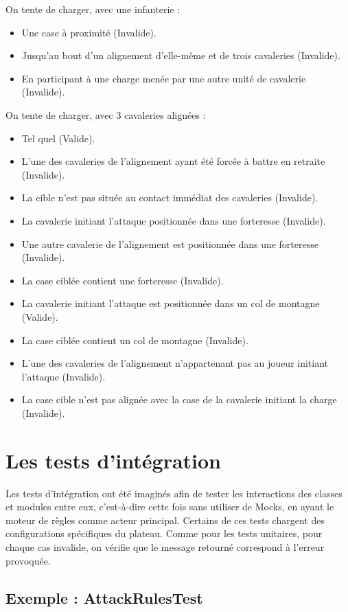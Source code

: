 \documentclass[a4paper]{report}
\begin{document}
On tente de charger, avec une infanterie :
\begin{itemize}
\item Une case à proximité (Invalide).
\item Jusqu'au bout d'un alignement d'elle-même et de trois cavaleries (Invalide).
\item En participant à une charge menée par une autre unité de cavalerie (Invalide).
\end{itemize}

On tente de charger, avec 3 cavaleries alignées :
\begin{itemize}
\item Tel quel (Valide).
\item L'une des cavaleries de l'alignement ayant été forcée à battre en retraite (Invalide).
\item La cible n'est pas située au contact immédiat des cavaleries (Invalide).
\item La cavalerie initiant l'attaque positionnée dans une forteresse (Invalide).
\item Une autre cavalerie de l'alignement est positionnée dans une forteresse (Invalide).
\item La case ciblée contient une forteresse (Invalide).
\item La cavalerie initiant l'attaque est positionnée dans un col de montagne (Valide).
\item La case ciblée contient un col de montagne (Invalide).
\item L'une des cavaleries de l'alignement n'appartenant pas au joueur initiant l'attaque (Invalide).
\item La case cible n'est pas alignée avec la case de la cavalerie initiant la charge (Invalide).
\end{itemize}

\section{Les tests d'intégration}
Les tests d'intégration ont été imaginés afin de tester les interactions des classes et modules entre eux, c'est-à-dire cette fois sans utiliser de Mocks, en ayant le moteur de règles comme acteur principal. Certains de ces tests chargent des configurations spécifiques du plateau. Comme pour les tests unitaires, pour chaque cas invalide, on vérifie que le message retourné correspond à l'erreur provoquée.

\subsection*{Exemple : AttackRulesTest}
\end{document}
